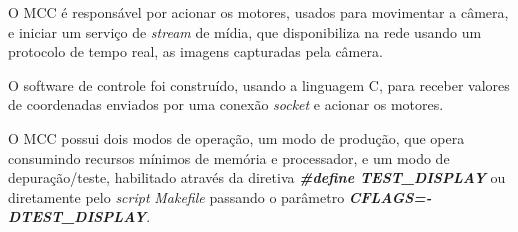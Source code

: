 O MCC é responsável por acionar os motores, usados para movimentar a câmera, e iniciar um serviço de \textit{stream} de mídia, que disponibiliza na rede usando um protocolo de tempo real, as imagens capturadas pela câmera.\par

O software de controle foi construído, usando a linguagem C, para receber valores de coordenadas enviados por uma conexão \textit{socket} e acionar os motores.\par

O MCC possui dois modos de operação, um modo de produção, que opera consumindo recursos mínimos de memória e processador, e um modo de depuração/teste, habilitado através da diretiva \textbf{\textit{\#define TEST\_DISPLAY}} ou diretamente pelo \textit{script} \textit{Makefile} passando o parâmetro \textbf{\textit{CFLAGS=-DTEST\_DISPLAY}}.
